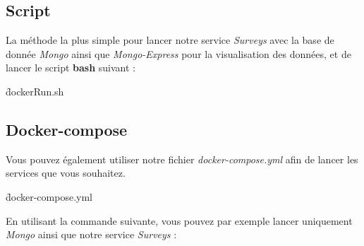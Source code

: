 \documentclass[a4paper,11pt]{article}
\begin{document}
	\subsection{Script}
	La méthode la plus simple pour lancer notre service \textit{Surveys} avec la base de donnée \textit{Mongo} ainsi que \textit{Mongo-Express} pour la visualisation des données, et de lancer le script \textbf{bash} suivant : 
	
	\f{dockerRun.sh}
	
	\subsection{Docker-compose}
	Vous pouvez également utiliser notre fichier \textit{docker-compose.yml} afin de lancer les services que vous souhaitez.
	
	\f{docker-compose.yml}
	
	En utilisant la commande suivante, vous pouvez par exemple lancer uniquement \textit{Mongo} ainsi que notre service \textit{Surveys} : 
\end{document}
